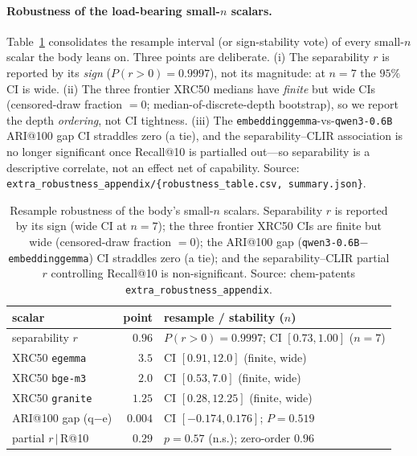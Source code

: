 \documentclass[11pt]{article}
\begin{document}
\paragraph{Robustness of the load-bearing small-$n$ scalars.}
\label{app:robust}
Table~\ref{tab:robust} consolidates the resample interval (or sign-stability
vote) of every small-$n$ scalar the body leans on. Three points are deliberate.
(i) The separability $r$ is reported by its \emph{sign} ($P(r>0)=0.9997$), not
its magnitude: at $n{=}7$ the $95\%$ CI is wide. (ii) The three frontier XRC50
medians have \emph{finite} but wide CIs (censored-draw fraction $=0$;
median-of-discrete-depth bootstrap), so we report the depth \emph{ordering}, not
CI tightness. (iii) The \texttt{embeddinggemma}-vs-\texttt{qwen3-0.6B} ARI@100
gap CI straddles zero (a tie), and the separability--CLIR association is no longer
significant once Recall@10 is partialled out---so separability is a descriptive
correlate, not an effect net of capability. Source:
\texttt{extra\_robustness\_appendix/\{robustness\_table.csv, summary.json\}}.

\begin{table}[t]
  \centering
  \small
  \begin{tabular}{lrl}
    \toprule
    scalar & point & resample / stability ($n$) \\
    \midrule
    separability $r$ & $0.96$ & $P(r{>}0){=}0.9997$; CI $[0.73,1.00]$ ($n{=}7$) \\
    XRC50 \texttt{egemma} & $3.5$ & CI $[0.91,12.0]$ (finite, wide) \\
    XRC50 \texttt{bge-m3} & $2.0$ & CI $[0.53,7.0]$ (finite, wide) \\
    XRC50 \texttt{granite} & $1.25$ & CI $[0.28,12.25]$ (finite, wide) \\
    ARI@100 gap (q$-$e) & $0.004$ & CI $[-0.174,0.176]$; $P{=}0.519$ \\
    partial $r\,|\,$R@10 & $0.29$ & $p{=}0.57$ (n.s.); zero-order $0.96$ \\
    \bottomrule
  \end{tabular}
  \caption{Resample robustness of the body's small-$n$ scalars. Separability $r$
  is reported by its sign (wide CI at $n{=}7$); the three frontier XRC50 CIs are
  finite but wide (censored-draw fraction $=0$); the ARI@100 gap
  (\texttt{qwen3-0.6B}$-$\texttt{embeddinggemma}) CI straddles zero (a tie); and
  the separability--CLIR partial $r$ controlling Recall@10 is non-significant.
  Source: chem-patents \texttt{extra\_robustness\_appendix}.}
  \label{tab:robust}
\end{table}
\end{document}
